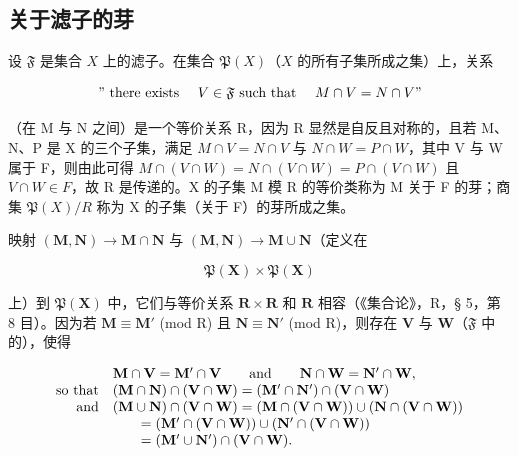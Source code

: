 \subsection{关于滤子的芽}

设 \(\mathfrak{F}\) 是集合 \(X\) 上的滤子。在集合 \(\mathfrak{P}(X)\)（\(X\) 的所有子集所成之集）上，关系

\[
" \text { there   exists } \quad V \in \mathfrak {F} \text { such   that } \quad M \cap V = N \cap V"
\]

（在 M 与 N 之间）是一个等价关系 R，因为 R 显然是自反且对称的，且若 M、N、P 是 X 的三个子集，满足 \(M \cap V = N \cap V\) 与 \(N \cap W = P \cap W\)，其中 V 与 W 属于 F，则由此可得 \(M \cap (V \cap W) = N \cap (V \cap W) = P \cap (V \cap W)\) 且 \(V \cap W \in F\)，故 R 是传递的。X 的子集 M 模 R 的等价类称为 M 关于 F 的芽；商集 \(\mathfrak{P}(X)/R\) 称为 X 的子集（关于 F）的芽所成之集。

映射 \((\mathbf{M},\mathbf{N})\to \mathbf{M}\cap \mathbf{N}\) 与 \((\mathbf{M},\mathbf{N})\rightarrow \mathbf{M}\cup \mathbf{N}\)（定义在

\[
\mathfrak {P} (\mathbf {X}) \times \mathfrak {P} (\mathbf {X})
\]

上）到 \(\mathfrak{P}(\mathbf{X})\) 中，它们与等价关系 \(\mathbf{R} \times \mathbf{R}\) 和 \(\mathbf{R}\) 相容（《集合论》，R，§ 5，第 8 目）。因为若 \(\mathbf{M} \equiv \mathbf{M}'\) (mod R) 且 \(\mathbf{N} \equiv \mathbf{N}'\) (mod R)，则存在 \(\mathbf{V}\) 与 \(\mathbf{W}\)（\(\mathfrak{F}\) 中的），使得

\[
\begin{array}{r l} & {\mathbf {M} \cap \mathbf {V} = \mathbf {M} ^ {\prime} \cap \mathbf {V} \qquad \mathrm{and} \qquad \mathbf {N} \cap \mathbf {W} = \mathbf {N} ^ {\prime} \cap \mathbf {W},} \\ {\mathrm{so\ that}} & {(\mathbf {M} \cap \mathbf {N}) \cap (\mathbf {V} \cap \mathbf {W}) = (\mathbf {M} ^ {\prime} \cap \mathbf {N} ^ {\prime}) \cap (\mathbf {V} \cap \mathbf {W})} \\ {\mathrm{and}} & {(\mathbf {M} \cup \mathbf {N}) \cap (\mathbf {V} \cap \mathbf {W}) = (\mathbf {M} \cap (\mathbf {V} \cap \mathbf {W})) \cup (\mathbf {N} \cap (\mathbf {V} \cap \mathbf {W}))} \\ & {\qquad = (\mathbf {M} ^ {\prime} \cap (\mathbf {V} \cap \mathbf {W})) \cup (\mathbf {N} ^ {\prime} \cap (\mathbf {V} \cap \mathbf {W}))} \\ & {\qquad = (\mathbf {M} ^ {\prime} \cup \mathbf {N} ^ {\prime}) \cap (\mathbf {V} \cap \mathbf {W}).} \end{array}
\]

